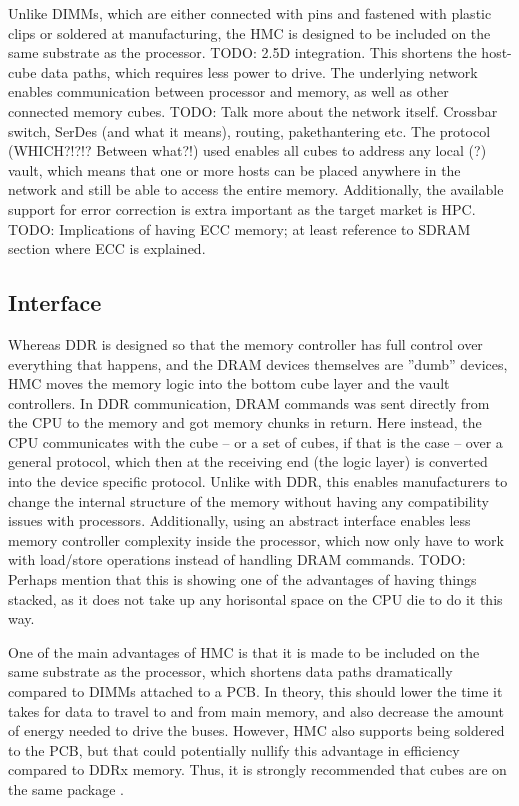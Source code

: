 Unlike DIMMs, which are either connected with pins and fastened with plastic clips or soldered at manufacturing, the HMC is designed to be included on the same substrate as the processor. TODO: 2.5D integration. This shortens the host-cube data paths, which requires less power to drive. The underlying network enables communication between processor and memory, as well as other connected memory cubes. TODO: Talk more about the network itself. Crossbar switch, SerDes (and what it means), routing, pakethantering etc. The protocol (WHICH?!?!? Between what?!) used enables all cubes to address any local (?) vault, which means that one or more hosts can be placed anywhere in the network and still be able to access the entire memory. Additionally, the available support for error correction is extra important as the target market is HPC. TODO: Implications of having ECC memory; at least reference to SDRAM section where ECC is explained. 

\subsection{Interface}
Whereas DDR is designed so that the memory controller has full control over everything that happens, and the DRAM devices themselves are ''dumb'' devices, HMC moves the memory logic into the bottom cube layer and the vault controllers. In DDR communication, DRAM commands was sent directly from the CPU to the memory and got memory chunks in return. Here instead, the CPU communicates with the cube -- or a set of cubes, if that is the case -- over a general protocol, which then at the receiving end (the logic layer) is converted into the device specific protocol. Unlike with DDR, this enables manufacturers to change the internal structure of the memory without having any compatibility issues with processors. Additionally, using an abstract interface enables less memory controller complexity inside the processor, which now only have to work with load/store operations instead of handling DRAM commands. TODO: Perhaps mention that this is showing one of the advantages of having things stacked, as it does not take up any horisontal space on the CPU die to do it this way.
\bigskip

One of the main advantages of HMC is that it is made to be included on the same substrate as the processor, which shortens data paths dramatically compared to DIMMs attached to a PCB. In theory, this should lower the time it takes for data to travel to and from main memory, and also decrease the amount of energy needed to drive the buses. However, HMC also supports being soldered to the PCB, but that could potentially nullify this advantage in efficiency compared to DDRx memory. Thus, it is strongly recommended that cubes are on the same package \cite{hybrid2013hybrid}.
\bigskip

